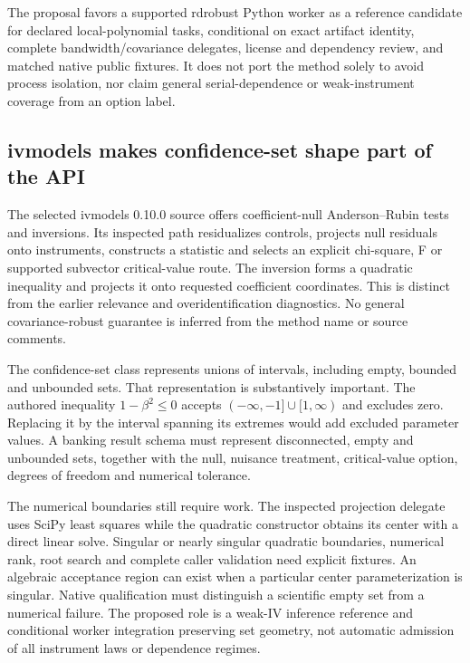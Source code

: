 The proposal favors a supported rdrobust Python worker as a reference
candidate for declared local-polynomial tasks, conditional on exact artifact
identity, complete bandwidth/covariance delegates, license and dependency
review, and matched native public fixtures. It does not port the method
solely to avoid process isolation, nor claim general serial-dependence or
weak-instrument coverage from an option label.
\citep{exec25_pyrdiv_choice}

\subsection{ivmodels makes confidence-set shape part of the API}
The selected ivmodels 0.10.0 source offers coefficient-null Anderson--Rubin
tests and inversions. Its inspected path residualizes controls, projects
null residuals onto instruments, constructs a statistic and selects an
explicit chi-square, F or supported subvector critical-value route.
The inversion forms a quadratic inequality and projects it onto requested
coefficient coordinates. This is distinct from the earlier relevance and
overidentification diagnostics. No general covariance-robust guarantee is
inferred from the method name or source comments.
\citep{exec25_pyrdiv_ivmodels}

The confidence-set class represents unions of intervals, including empty,
bounded and unbounded sets. That representation is substantively important.
The authored inequality $1-\beta^2\leq0$ accepts
$(-\infty,-1]\cup[1,\infty)$ and excludes zero. Replacing it by the
interval spanning its extremes would add excluded parameter values.
A banking result schema must represent disconnected, empty and unbounded
sets, together with the null, nuisance treatment, critical-value option,
degrees of freedom and numerical tolerance.\citep{exec25_pyrdiv_ivmodels,
exec25_pyrdiv_choice}

The numerical boundaries still require work. The inspected projection
delegate uses SciPy least squares while the quadratic constructor obtains
its center with a direct linear solve. Singular or nearly singular
quadratic boundaries, numerical rank, root search and complete caller
validation need explicit fixtures. An algebraic acceptance region can
exist when a particular center parameterization is singular. Native
qualification must distinguish a scientific empty set from a numerical
failure. The proposed role is a weak-IV inference reference and conditional
worker integration preserving set geometry, not automatic admission of
all instrument laws or dependence regimes.\citep{exec25_pyrdiv_ivmodels,
exec25_pyrdiv_choice}


